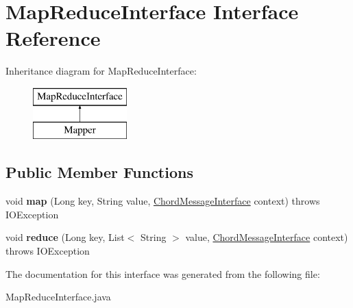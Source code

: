 \hypertarget{interface_map_reduce_interface}{}\section{Map\+Reduce\+Interface Interface Reference}
\label{interface_map_reduce_interface}
Inheritance diagram for Map\+Reduce\+Interface\+:\begin{figure}[H]
\begin{center}
\leavevmode
\includegraphics[height=2.000000cm]{interface_map_reduce_interface}
\end{center}
\end{figure}
\subsection*{Public Member Functions}
\begin{DoxyCompactItemize}
\item 
\mbox{\label{interface_map_reduce_interface_aceecf9558b0390e89c3995a2711e3f15}} 
void {\bfseries map} (Long key, String value, \mbox{\hyperlink{interface_chord_message_interface}{Chord\+Message\+Interface}} context)  throws I\+O\+Exception
\item 
\mbox{\label{interface_map_reduce_interface_a2824dc60ea3e1415dc01a5d0c6e7b683}} 
void {\bfseries reduce} (Long key, List$<$ String $>$ value, \mbox{\hyperlink{interface_chord_message_interface}{Chord\+Message\+Interface}} context)  throws I\+O\+Exception
\end{DoxyCompactItemize}


The documentation for this interface was generated from the following file\+:\begin{DoxyCompactItemize}
\item 
Map\+Reduce\+Interface.\+java\end{DoxyCompactItemize}
